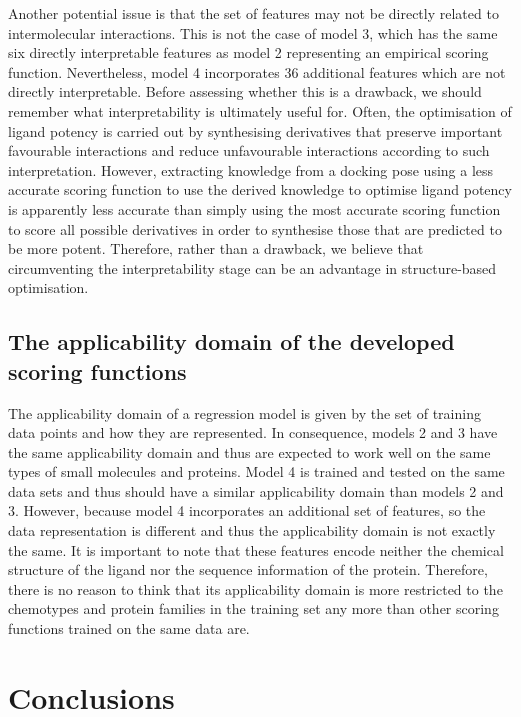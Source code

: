 Another potential issue is that the set of features may not be directly related to intermolecular interactions. This is not the case of model 3, which has the same six directly interpretable features as model 2 representing an empirical scoring function. Nevertheless, model 4 incorporates 36 additional features which are not directly interpretable. Before assessing whether this is a drawback, we should remember what interpretability is ultimately useful for. Often, the optimisation of ligand potency is carried out by synthesising derivatives that preserve important favourable interactions and reduce unfavourable interactions according to such interpretation. However, extracting knowledge from a docking pose using a less accurate scoring function to use the derived knowledge to optimise ligand potency is apparently less accurate than simply using the most accurate scoring function to score all possible derivatives in order to synthesise those that are predicted to be more potent. Therefore, rather than a drawback, we believe that circumventing the interpretability stage can be an advantage in structure-based optimisation.

\subsection{The applicability domain of the developed scoring functions}

The applicability domain of a regression model is given by the set of training data points and how they are represented. In consequence, models 2 and 3 have the same applicability domain and thus are expected to work well on the same types of small molecules and proteins. Model 4 is trained and tested on the same data sets and thus should have a similar applicability domain than models 2 and 3. However, because model 4 incorporates an additional set of features, so the data representation is different and thus the applicability domain is not exactly the same. It is important to note that these features encode neither the chemical structure of the ligand nor the sequence information of the protein. Therefore, there is no reason to think that its applicability domain is more restricted to the chemotypes and protein families in the training set any more than other scoring functions trained on the same data are.

\section{Conclusions}

